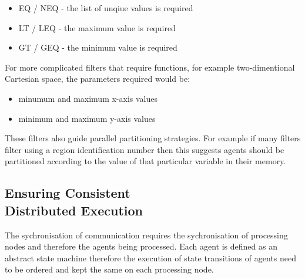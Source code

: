 \documentclass{aamas2009}
\begin{document}
\begin{itemize}
  \item EQ / NEQ - the list of unqiue values is required
  \item LT / LEQ - the maximum value is required
  \item GT / GEQ - the minimum value is required
\end{itemize}

For more complicated filters that require functions, for example
two-dimentional Cartesian space, the parameters required would be:

\begin{itemize}
  \item minumum and maximum x-axis values
  \item minimum and maximum y-axis values
\end{itemize}

These filters also guide parallel partitioning strategies. For example if many
filters filter using a region identification number then this suggests agents
should be partitioned according to the value of that particular variable in
their memory.


\subsection{Ensuring Consistent\\Distributed Execution}

The sychronisation of communication requires the sychronisation of processing
nodes and therefore the agents being processed.
Each agent is defined as an abstract state machine therefore the execution of 
state transitions of agents need to be ordered and kept the same on each
processing node.


\end{document}

